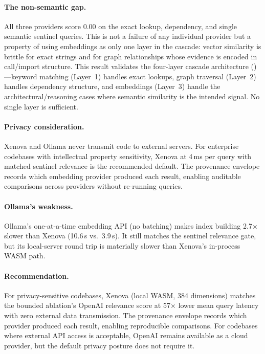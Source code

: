 \documentclass[conference]{IEEEtran}
\begin{document}
\paragraph{The non-semantic gap.}
All three providers score 0.00 on the exact lookup, dependency, and
single semantic sentinel queries. This is not a failure of any individual
provider but a property of using embeddings as only one layer in the
cascade: vector similarity is brittle for exact strings and for graph
relationships whose evidence is encoded in call/import structure. This
result validates the four-layer cascade architecture
()---keyword matching (Layer~1) handles exact
lookups, graph traversal (Layer~2) handles dependency structure, and
embeddings (Layer~3) handle the architectural/reasoning cases where
semantic similarity is the intended signal. No single layer is
sufficient.

\paragraph{Privacy consideration.}
Xenova and Ollama never transmit code to external servers. For enterprise
codebases with intellectual property sensitivity, Xenova at 4\,ms per
query with matched sentinel relevance is the recommended default. The
provenance envelope records which embedding provider produced each
result, enabling auditable comparisons across providers without
re-running queries.

\paragraph{Ollama's weakness.}
Ollama's one-at-a-time embedding API (no batching) makes index building
2.7$\times$ slower than Xenova (10.6\,s vs.\ 3.9\,s). It still matches
the sentinel relevance gate, but its local-server round trip is
materially slower than Xenova's in-process WASM path.

\paragraph{Recommendation.}
For privacy-sensitive codebases, Xenova (local WASM, 384 dimensions)
matches the bounded ablation's OpenAI relevance score at 57$\times$
lower mean query latency with zero external data transmission. The
provenance envelope records which provider produced each result,
enabling reproducible comparisons. For codebases where external API
access is acceptable, OpenAI remains available as a cloud provider, but
the default privacy posture does not require it.
\end{document}
